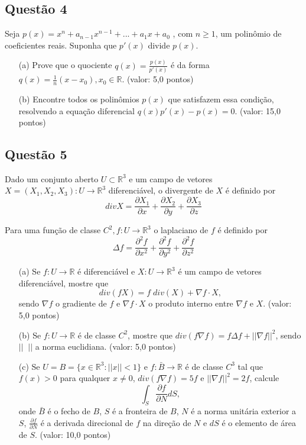 \documentclass{report}
\begin{document}
\subsection{\color{blue} Quest\~ao 4}

Seja $p(x) = x^n + a_{n-1} x^{n-1} + ... + a_1 x + a_0$ , com $n \geq 1$, um polinômio de coeficientes reais. Suponha que $p'(x)$ divide $p(x)$.

\begin{enumerate}

\item[(a)] Prove que o quociente $q(x) = \displaystyle \frac{p(x)}{p'(x)}$ \'e da forma $q(x) = \frac1{n} (x-x_0), x_0 \in \mathbb R$. (valor: 5,0 pontos)

\item[(b)] Encontre todos os polinômios $p(x)$ que satisfazem essa condi\c c\~ao, resolvendo a equa\c c\~ao diferencial $q(x) p'(x)-p(x) = 0$. (valor: 15,0 pontos)

\end{enumerate}

\subsection{\color{blue} Quest\~ao 5}

Dado um conjunto aberto $U \subset \mathbb R^3$ e um campo de vetores $X = (X_1 , X_2 , X_3 ): U \to \mathbb R^3$ diferenci\'avel, o divergente de $X$ \'e definido por $$div X=\frac{\partial X_1}{\partial x}+\frac{\partial X_2}{\partial y}+\frac{\partial X_3}{\partial z}$$

Para uma fun\c c\~ao de classe $C^2, f: U \to \mathbb R^3$ o laplaciano de $f$ \'e definido por $$\Delta f = \frac{\partial^2 f}{\partial x^2}+\frac{\partial^2 f}{\partial y^2}+\frac{\partial^2 f}{\partial z^2}$$

\begin{enumerate}

\item[(a)] Se $f: U \to \mathbb R$ \'e diferenci\'avel e $X: U \to \mathbb R^3$ \'e um campo de vetores diferenci\'avel, mostre que $$div(f X)=f\; div(X) + \nabla f \cdot X ,$$ sendo $\nabla f$ o gradiente de $f$ e $\nabla f \cdot X$ o produto interno entre $\nabla f$ e $X$. (valor: 5,0 pontos)

\item[(b)] Se $f: U \to \mathbb R$ \'e de classe $C^2$, mostre que $div(f\nabla f) = f \Delta f + || \nabla f ||^2$, sendo $||\;\;||$ a norma euclidiana. (valor: 5,0 pontos)

\item[(c)] Se $U = B = \{x \in \mathbb R^3: || x || < 1\}$ e $f: \bar B \to \mathbb R$ \'e de classe $C^3$ tal que $f(x) > 0$ para qualquer $x \neq 0$, $div(f \nabla f) = 5f$ e $|| \nabla f ||^2= 2f$, calcule $$ \int_S \frac{\partial f}{\partial N} dS ,$$ onde $\bar B$ \'e o fecho de $B$, $S$ \'e a fronteira de $B$, $N$ \'e a norma unit\'aria exterior a $S$, $\displaystyle \frac{\partial f}{\partial N}$ \'e a derivada direcional de $f$ na dire\c c\~ao de $N$ e $dS$ \'e o elemento de \'area de $S$. (valor: 10,0 pontos)

\end{enumerate}
\end{document}
